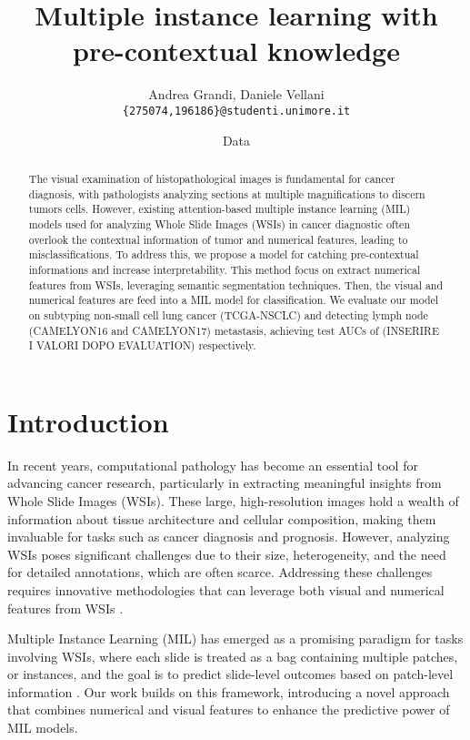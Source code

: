 \documentclass[10pt,twocolumn]{article}
\title{\textbf{Multiple instance learning with pre-contextual knowledge}}
\author{Andrea Grandi, Daniele Vellani \\
\texttt{\{275074,196186\}@studenti.unimore.it}}
\date{Data}
\begin{document}
\maketitle

\begin{abstract}
\noindent 
The visual examination of histopathological images is fundamental for cancer diagnosis, with pathologists analyzing sections at multiple magnifications to discern tumors cells. However, existing attention-based multiple instance learning (MIL) models used for analyzing Whole Slide Images (WSIs) in cancer diagnostic often overlook the contextual information of tumor and numerical features, leading to misclassifications. To address this, we propose a model for catching pre-contextual informations and increase interpretability. This method focus on extract numerical features from WSIs, leveraging semantic segmentation techniques. Then, the visual and numerical features are feed into a MIL model for classification. We evaluate our model on subtyping non-small cell lung cancer (TCGA-NSCLC) and detecting lymph node (CAMELYON16 and CAMELYON17) metastasis, achieving test AUCs of (INSERIRE I VALORI DOPO EVALUATION) respectively. 

\end{abstract}

\section{Introduction}
In recent years, computational pathology has become an essential tool for advancing cancer research, particularly in extracting meaningful insights from Whole Slide Images (WSIs). These large, high-resolution images hold a wealth of information about tissue architecture and cellular composition, making them invaluable for tasks such as cancer diagnosis and prognosis. However, analyzing WSIs poses significant challenges due to their size, heterogeneity, and the need for detailed annotations, which are often scarce. Addressing these challenges requires innovative methodologies that can leverage both visual and numerical features from WSIs \cite{litjens2017survey, campanella2019clinical}.

Multiple Instance Learning (MIL) has emerged as a promising paradigm for tasks involving WSIs, where each slide is treated as a bag containing multiple patches, or instances, and the goal is to predict slide-level outcomes based on patch-level information \cite{ilse2018attention, campanella2019clinical}. Our work builds on this framework, introducing a novel approach that combines numerical and visual features to enhance the predictive power of MIL models.
\end{document}
